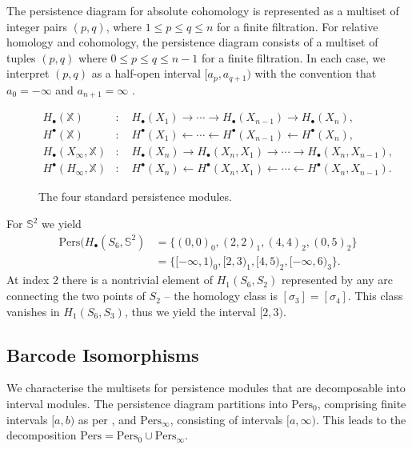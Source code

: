 The persistence diagram for absolute cohomology is represented as a multiset of integer pairs \((p,q)\), where \(1 \leq p \leq q \leq n\) for a finite filtration. For relative homology and cohomology, the persistence diagram consists of a multiset of tuples \((p,q)\) where \(0 \leq p \leq q \leq n-1\) for a finite filtration. In each case, we interpret \((p,q)\) as a half-open interval \([a_p, a_{q+1})\) with the convention that \(a_0 = -\infty\) and \(a_{n+1} = \infty\) \cite[§2.4]{de2011dualities}.

\begin{figure}
\begin{align*}
	H_\bullet(\mathbb{X}) &: \quad H_\bullet(X_1) \rightarrow \cdots \rightarrow H_\bullet(X_{n-1}) \rightarrow H_\bullet(X_n), \\
	H^\bullet(\mathbb{X}) &: \quad H^\bullet(X_1) \leftarrow \cdots \leftarrow H^\bullet(X_{n-1}) \leftarrow H^\bullet(X_n), \\
	H_\bullet(X_\infty, \mathbb{X})&: \quad H_\bullet(X_n) \rightarrow H_\bullet(X_n,X_1) \rightarrow \cdots \rightarrow H_\bullet(X_n,X_{n-1}), \\
	H^{\bullet}(H_\infty, \mathbb{X})&: \quad H^{\bullet}(X_n) \leftarrow H^{\bullet}(X_n,X_1) \leftarrow \cdots \leftarrow H^{\bullet}(X_n, X_{n-1}).
\end{align*}
\caption{The four standard persistence modules.}
\end{figure}

\begin{example}
For $\mathbb{S}^2$ we yield
\begin{align}
	\text{Pers}(H_\bullet(S_6,\mathbb{S}^2) &= \{(0,0)_0, (2,2)_1, (4,4)_2, (0,5)_2\} \\
	&= \{[-\infty, 1)_0, [2,3)_1, [4,5)_2, [-\infty,6)_3\}.
\end{align}
At index $2$ there is a nontrivial element of $H_1(S_6,S_2)$ represented by any arc connecting the two points of $S_2$ \cite[§2.4]{de2011dualities} -- the homology class is $[\sigma_3] = [\sigma_4]$. This class vanishes in $H_1(S_6,S_3)$, thus we yield the interval $[2,3)$.
\end{example}

\subsection{Barcode Isomorphisms}
We characterise the multisets for persistence modules that are decomposable into interval modules. The persistence diagram partitions into $\text{Pers}_0$, comprising finite intervals $[a, b)$ as per \cite[§2.3]{de2011dualities}, and $\text{Pers}_\infty$, consisting of intervals $[a, \infty)$. This leads to the decomposition $\text{Pers} = \text{Pers}_0 \cup \text{Pers}_\infty$.

